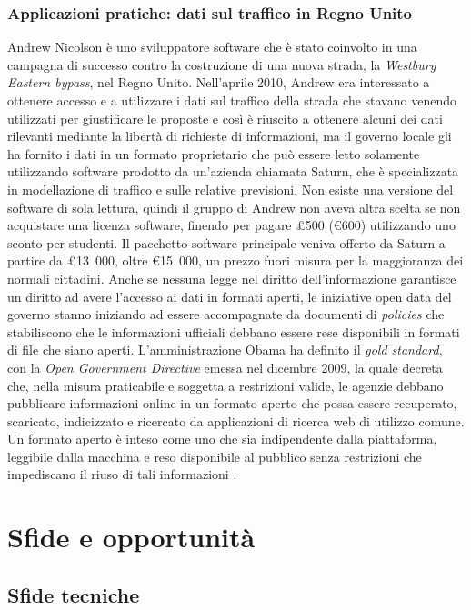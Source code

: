 \subsubsection{Applicazioni pratiche: dati sul traffico in Regno Unito}
Andrew Nicolson è uno sviluppatore software che è stato coinvolto in una campagna di successo contro la costruzione di una nuova strada, la \textit{Westbury Eastern bypass}, nel Regno Unito. Nell'aprile 2010, Andrew era interessato a ottenere accesso e a utilizzare i dati sul traffico della strada che stavano venendo utilizzati per giustificare le proposte e così è riuscito a ottenere alcuni dei dati rilevanti mediante la libertà di richieste di informazioni, ma il governo locale gli ha fornito i dati in un formato proprietario che può essere letto solamente utilizzando software prodotto da un'azienda chiamata Saturn, che è specializzata in modellazione di traffico e sulle relative previsioni. Non esiste una versione del software di sola lettura, quindi il gruppo di Andrew non aveva altra scelta se non acquistare una licenza software, finendo per pagare £500 (€600) utilizzando uno sconto per studenti. Il pacchetto software principale veniva offerto da Saturn a partire da £13\ 000, oltre €15\ 000, un prezzo fuori misura per la maggioranza dei normali cittadini. Anche se nessuna legge nel diritto dell'informazione garantisce un diritto ad avere l'accesso ai dati in formati aperti, le iniziative open data del governo stanno iniziando ad essere accompagnate da documenti di \textit{policies} che stabiliscono che le informazioni ufficiali debbano essere rese disponibili in formati di file che siano aperti. L'amministrazione Obama ha definito il \textit{gold standard}, con la \textit{Open Government Directive} emessa nel dicembre 2009, la quale decreta che, nella misura praticabile e soggetta a restrizioni valide, le agenzie debbano pubblicare informazioni online in un formato aperto che possa essere recuperato, scaricato, indicizzato e ricercato da applicazioni di ricerca web di utilizzo comune. Un formato aperto è inteso come uno che sia indipendente dalla piattaforma, leggibile dalla macchina e reso disponibile al pubblico senza restrizioni che impediscano il riuso di tali informazioni \cite{OpenDataHandbook_FileFormats}.


\section{Sfide e opportunità}   %
\subsection{Sfide tecniche}
